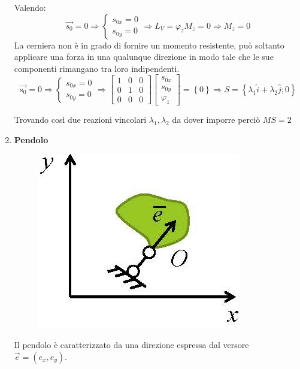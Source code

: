\documentclass{article}
\begin{document}
\begin{adjustwidth}{2in}{}
\begin{enumerate}
	Valendo: 
		\[ 
	\vec{s_{0}} = 0 \Rightarrow \begin{cases}
		s_{0x} = 0 \\
		s_{0y} = 0
	\end{cases} \Rightarrow 	L_{V} = \varphi_{z}M_{z} = 0 \Rightarrow M_{z} = 0
	\]
La cerniera non è in grado di fornire un momento resistente, può soltanto applicare una forza in una qualunque direzione in modo tale che le sue componenti rimangano tra loro indipendenti. 
	\[ 
\vec{s_{0}} = 0 \Rightarrow \begin{cases}
	s_{0x} = 0 \\
	s_{0y} = 0
\end{cases} \Rightarrow \left[\begin{array}{ccc}
1 & 0 & 0 \\
0 & 1 & 0 \\
0 & 0 & 0
\end{array}\right] \left[ \begin{array}{c}
s_{0x} \\
s_{0y} \\
\varphi_{z}
\end{array}\right] = \left\lbrace 0 \right\rbrace  \Rightarrow S = \left\lbrace \lambda_{1} \hat{i} + \lambda_{2} \hat{j};0\right\rbrace 
	\]
	
Trovando così due reazioni vincolari $\lambda_{1}, \lambda_{2}$ da dover imporre perciò $ MS = 2$
\newpage
\item \textbf{Pendolo}\newline
\begin{figure}[H]
	\centering
	\includegraphics[width=0.25\linewidth]{"immagini/1.PARTE1_Pagina_31"}
\end{figure}
Il pendolo è caratterizzato da una direzione espressa dal versore $\vec{e} = (e_{x}, e_{y})$.


\end{enumerate}
\end{adjustwidth}
\end{document}

